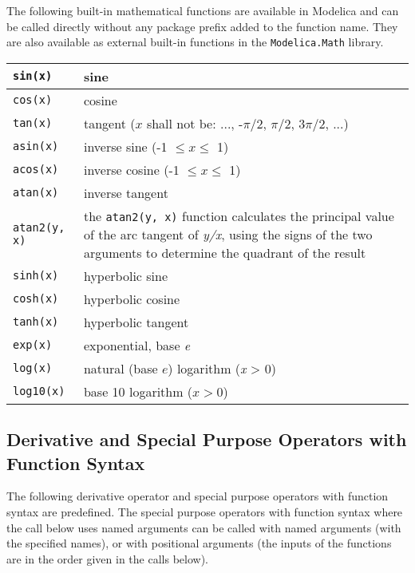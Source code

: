 The following built-in mathematical functions are available in Modelica
and can be called directly without any package prefix added to the
function name. They are also available as external built-in functions in
the \lstinline!Modelica.Math! library.

\begin{longtable}{|l|p{8cm}|} 
\hline \endhead 
\lstinline!sin(x)! & sine\\ \hline
\lstinline!cos(x)! & cosine\\ \hline
\lstinline!tan(x)! & tangent ($x$ shall not be: ..., -$\pi$/2, $\pi$/2, 3$\pi$/2, ...)\\ \hline
\lstinline!asin(x)! & inverse sine (-1 $\le x \le$ 1)\\ \hline
\lstinline!acos(x)! & inverse cosine (-1 $\le x \le$ 1)\\ \hline
\lstinline!atan(x)! & inverse tangent\\ \hline
\lstinline!atan2(y, x)! & the \lstinline!atan2(y, x)! function calculates the principal value of the arc tangent of \emph{y/x}, using the signs of the two arguments to determine the quadrant of the result\\ \hline
\lstinline!sinh(x)! & hyperbolic sine\\ \hline
\lstinline!cosh(x)! & hyperbolic cosine\\ \hline
\lstinline!tanh(x)! & hyperbolic tangent\\ \hline
\lstinline!exp(x)! & exponential, base \emph{e}\\ \hline
\lstinline!log(x)! & natural (base $e$) logarithm (\emph{x} \textgreater{} 0)\\ \hline
\lstinline!log10(x)! & base 10 logarithm ($x>0$)\\ \hline                                    
\end{longtable}

\subsection{Derivative and Special Purpose Operators with Function Syntax}

The following derivative operator and special purpose operators with
function syntax are predefined. The special purpose operators with
function syntax where the call below uses named arguments can be called
with named arguments (with the specified names), or with positional
arguments (the inputs of the functions are in the order given in the
calls below).

